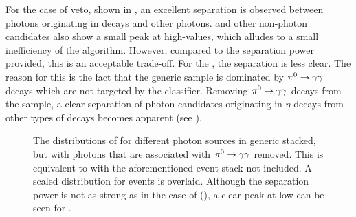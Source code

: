 For the case of \piz veto, shown in , an excellent separation is observed between photons originating in \piz decays and other photons.
\BtoXsgamma and other non-\piz photon candidates also show a small peak at high-\piVeto values, which alludes to a small inefficiency of the algorithm.
However, compared to the separation power provided, this is an acceptable trade-off.
For the \etaVeto, the separation is less clear.
The reason for this is the fact that the generic \MC sample is dominated by $\pi^0\rightarrow\gamma\gamma$ decays which are not targeted by the \etaVeto classifier.
Removing $\pi^0\rightarrow\gamma\gamma$ decays from the sample, a clear separation of photon candidates originating in $\eta$ decays from other types of decays becomes apparent (see ).

\begin{figure}[htbp!]
    \centering
    \caption{\label{fig:vetos_nopi} The distributions of \etaVeto {} 
    for different photon sources in generic \MC stacked, but with photons that are associated with $\pi^0\rightarrow\gamma\gamma$ removed.
    This is equivalent to  with the aforementioned event stack not included.
    A scaled \etaVeto distribution for \BtoXsgamma events is overlaid.
    Although the separation power is not as strong as in the case of \piVeto (), a clear peak at low-\etaVeto can be seen for \BtoXsgamma.
    }
\end{figure}


